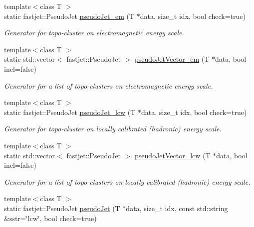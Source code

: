 \begin{DoxyCompactItemize}
\item 
{\footnotesize template$<$class T $>$ }\\static fastjet\+::\+Pseudo\+Jet \hyperlink{structAnalysisHelper_1_1TopoCluster_a85b22d495e10c3fab507d1021ac58e25}{pseudo\+Jet\+\_\+em} (T $\ast$data, size\+\_\+t idx, bool check=true)
\begin{DoxyCompactList}\small\item\em Generator for topo-\/cluster on electromagnetic energy scale. \end{DoxyCompactList}\item 
{\footnotesize template$<$class T $>$ }\\static std\+::vector$<$ fastjet\+::\+Pseudo\+Jet $>$ \hyperlink{structAnalysisHelper_1_1TopoCluster_a42c486ac46367d594c9a94fec7fa39a2}{pseudo\+Jet\+Vector\+\_\+em} (T $\ast$data, bool incl=false)
\begin{DoxyCompactList}\small\item\em Generator for a list of topo-\/clusters on electromagnetic energy scale. \end{DoxyCompactList}\item 
{\footnotesize template$<$class T $>$ }\\static fastjet\+::\+Pseudo\+Jet \hyperlink{structAnalysisHelper_1_1TopoCluster_ae9197b3dde2144c2c04db69734c8f1d3}{pseudo\+Jet\+\_\+lcw} (T $\ast$data, size\+\_\+t idx, bool check=true)
\begin{DoxyCompactList}\small\item\em Generator for topo-\/cluster on locally calibrated (hadronic) energy scale. \end{DoxyCompactList}\item 
{\footnotesize template$<$class T $>$ }\\static std\+::vector$<$ fastjet\+::\+Pseudo\+Jet $>$ \hyperlink{structAnalysisHelper_1_1TopoCluster_a1e8f69d64ab36d08257141fc61d673d6}{pseudo\+Jet\+Vector\+\_\+lcw} (T $\ast$data, bool incl=false)
\begin{DoxyCompactList}\small\item\em Generator for a list of topo-\/clusters on locally calibrated (hadronic) energy scale. \end{DoxyCompactList}\item 
{\footnotesize template$<$class T $>$ }\\static fastjet\+::\+Pseudo\+Jet \hyperlink{structAnalysisHelper_1_1TopoCluster_ab15aed8b985c37ad97bb5bd4a71286e8}{pseudo\+Jet} (T $\ast$data, size\+\_\+t idx, const std\+::string \&sstr=\char`\"{}lcw\char`\"{}, bool check=true)

\end{DoxyCompactItemize}
